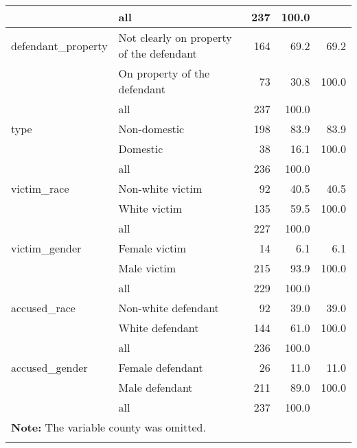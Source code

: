 \documentclass[11pt, oneside]{article}   	%
\begin{document}
{\begin{longtable}{ll|rrr}
   \hline
 & all & 237 & 100.0 &  \\ 
   \hline
\hline
defendant\_property & Not clearly on property of the defendant & 164 & 69.2 & 69.2 \\ 
   & On property of the defendant & 73 & 30.8 & 100.0 \\ 
   \hline
 & all & 237 & 100.0 &  \\ 
   \hline
\hline
type & Non-domestic & 198 & 83.9 & 83.9 \\ 
   & Domestic & 38 & 16.1 & 100.0 \\ 
   \hline
 & all & 236 & 100.0 &  \\ 
   \hline
\hline
victim\_race & Non-white victim & 92 & 40.5 & 40.5 \\ 
   & White victim & 135 & 59.5 & 100.0 \\ 
   \hline
 & all & 227 & 100.0 &  \\ 
   \hline
\hline
victim\_gender & Female victim & 14 & 6.1 & 6.1 \\ 
   & Male victim & 215 & 93.9 & 100.0 \\ 
   \hline
 & all & 229 & 100.0 &  \\ 
   \hline
\hline
accused\_race & Non-white defendant & 92 & 39.0 & 39.0 \\ 
   & White defendant & 144 & 61.0 & 100.0 \\ 
   \hline
 & all & 236 & 100.0 &  \\ 
   \hline
\hline
accused\_gender & Female defendant & 26 & 11.0 & 11.0 \\ 
   & Male defendant & 211 & 89.0 & 100.0 \\ 
   \hline
 & all & 237 & 100.0 &  \\ 
   \hline  \multicolumn{5}{l}{\textbf{Note: }
             The variable county was omitted.} \\ \hline
\hline
\hline
\label{Summary statistics for categorical variables}
\end{longtable}
}
\end{document}
